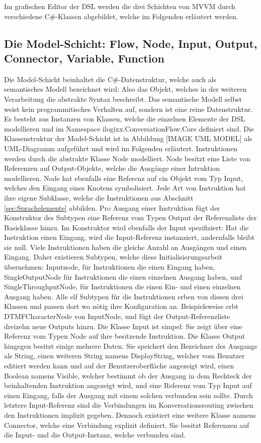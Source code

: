 \newline
Im grafischen Editor der DSL werden die drei Schichten von MVVM durch verschiedene C\#-Klassen abgebildet, welche im Folgenden erläutert werden.

\subsection{Die Model-Schicht: Flow, Node, Input, Output, Connector, Variable, Function}
\label{subsec:Die Model-Schicht}
Die Model-Schicht beinhaltet die C\#-Datenstruktur, welche auch als semantisches Modell bezeichnet wird: Also das Objekt, welches in der weiteren Verarbeitung die abstrakte Syntax beschreibt. Das semantische Modell selbst weist kein programmitisches Verhalten auf, sondern ist eine reine Datenstruktur. Es besteht aus Instanzen von Klassen, welche die einzelnen Elemente der DSL modellieren und im Namespace ilogixx.ConversationFlow.Core definiert sind. Die Klassenstruktur der Model-Schicht ist in Abbildung [IMAGE UML MODEL] als UML-Diagramm aufgeführt und wird im Folgenden erläutert.
\newline
Instruktionen werden durch die abstrakte Klasse Node modelliert. Node besitzt eine Liste von Referenzen auf Output-Objekte, welche die Ausgänge einer Intruktion modellieren. Node hat ebenfalls eine Referenz auf ein Objekt vom Typ Input, welches den Eingang eines Knotens symbolisiert. Jede Art von Instruktion hat ihre eigene Subklasse, welche die Instruktionen aus Abschnitt \ref{sec:Sprachelemente} abbilden. Pro Ausgang einer Instruktion fügt der Konstruktor des Subtypen eine Referenz vom Typen Output der Referenzliste der Basisklasse hinzu. Im Konstruktor wird ebenfalls der Input spezifiziert: Hat die Instruktion einen Eingang, wird die Input-Referenz instanziert, andernfalls bleibt sie null. Viele Instruktionen haben die gleiche Anzahl an Ausgängen und einen Eingang. Daher existieren Subtypen, welche diese Initialisierungsarbeit übernehmen: Inputnode, für Instruktionen die einen Eingang haben, SingleOutputNode für Instruktionen die einen einzelnen Ausgang haben, und SingleThroughputNode, für Instruktionen die einen Ein- und einen einzelnen Ausgang haben. Alle elf Subtypen für die Instruktionen erben von diesen drei Klassen und passen dort wo nötig ihre Konfiguration an. Beispielsweise erbt DTMFCharacterNode von InputNode, und fügt der Output-Referenzliste dreizehn neue Outputs hinzu.
\newline
Die Klasse Input ist simpel: Sie zeigt über eine Referenz vom Typen Node auf ihre besitzende Instruktion. Die Klasse Output hingegen besitzt einige mehrere Daten. Sie speichert den Bezeichner des Ausgangs als String, einen weiteren String namens DisplayString, welcher vom Benutzer editiert werden kann und auf der Benutzeroberfläche angezeigt wird, einen Boolean namens Visible, welcher bestimmt ob der Ausgang in dem Rechteck der beinhaltenden Instruktion angezeigt wird, und eine Referenz vom Typ Input auf einen Eingang, falls der Ausgang mit einem solchen verbunden sein sollte. Durch letztere Input-Referenz sind die Verbindungen im Konversationsrouting zwischen den Instruktionen implizit gegeben. Dennoch existiert eine weitere Klasse namens Connector, welche eine Verbindung explizit definiert. Sie besitzt Referenzen auf die Input- und die Output-Instanz, welche verbunden sind.
